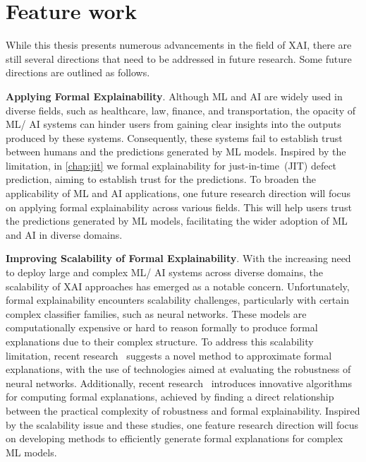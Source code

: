 \section*{Feature work}
While this thesis presents numerous advancements in the field of XAI, 
there are still several directions that need to be addressed in future research.
%
Some future directions are outlined as follows.

\textbf{Applying Formal Explainability}.
%
Although ML and AI are widely used in diverse fields, such as healthcare, law, finance, and transportation, 
the opacity of ML/ AI systems can hinder users from gaining clear insights into 
the outputs produced by these systems.
%
Consequently, these systems fail to establish trust between humans and the
predictions generated by ML models.
%
Inspired by the limitation, in \autoref{chap:jit} we  formal explainability for
just-in-time~(JIT) defect prediction, aiming to establish trust for the predictions.
%
To broaden the applicability of ML and AI applications, one future research direction 
will focus on applying formal explainability across various fields.
%
This will help users trust the predictions generated by ML models, facilitating the wider 
adoption of ML and AI in diverse domains.

\textbf{Improving Scalability of Formal Explainability}.
%
With the increasing need to deploy large and complex ML/ AI systems across diverse domains, 
the scalability of XAI approaches has emerged as a notable concern.
%
Unfortunately, formal explainability encounters scalability challenges, 
particularly with certain complex classifier families, such as neural networks.
%
These models are computationally expensive or hard to reason formally
to produce formal explanations due to their complex structure.
%
To address this scalability limitation, recent research~\cite{bk-tacas23} 
suggests a novel method to approximate formal explanations, with the use of 
technologies aimed at evaluating the robustness of neural networks.
%
Additionally, recent research~\cite{bk-tacas23} introduces innovative algorithms for computing
formal explanations, achieved by finding a direct relationship between 
the practical complexity of robustness and formal explainability.
%
Inspired by the scalability issue and these studies, one feature research direction
will focus on developing methods to efficiently
generate formal explanations for complex ML models.
